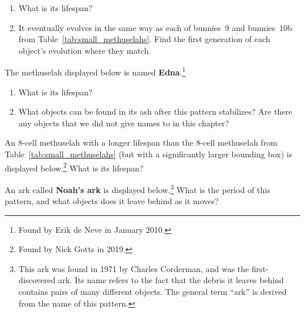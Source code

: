 \begin{multicols}{2}
\begin{problem}
		\begin{enumerate}[label=\bf\color{ocre}(\alph*)]
			\item What is its lifespan?
			
			\item It eventually evolves in the same way as each of bunnies~9 and bunnies~10b from Table~\ref{tab:small_methuselahs}. Find the first generation of each object's evolution where they match.
		\end{enumerate}
	\end{problem}
	
	
	\mfilbreak
	
	
	\begin{problem}\label{exer:edna} 
		The methuselah displayed below is named \textbf{Edna}.\footnote{Found by Erik de Neve in January 2010.}
		
		\begin{center}
		\end{center}
		
		\begin{enumerate}[label=\bf\color{ocre}(\alph*)]
			\item What is its lifespan?
			
			\item What objects can be found in its ash after this pattern stabilizes? Are there any objects that we did not give names to in this chapter?
		\end{enumerate}
	\end{problem}


	\mfilbreak
	
	
	\begin{problem}\label{exer:8cell_methuselah} 
		An $8$-cell methuselah with a longer lifespan than the $8$-cell methuselah from Table~\ref{tab:small_methuselahs} (but with a significantly larger bounding box) is displayed below.\footnote{Found by Nick Gotts in 2019.} What is its lifespan?
		
		\begin{center}
		\end{center}
	\end{problem}
	
	
	\mfilbreak
	
	
	\begin{problem}\label{exer:noahs_ark} 
		An ark called \textbf{Noah's ark} is displayed below.\footnote{This ark was found in 1971 by Charles Corderman, and was the first-discovered ark. Its name refers to the fact that the debris it leaves behind contains pairs of many different objects. The general term ``ark'' is derived from the name of this pattern.} What is the period of this pattern, and what objects does it leave behind as it moves?
		

\end{problem}
\end{multicols}
